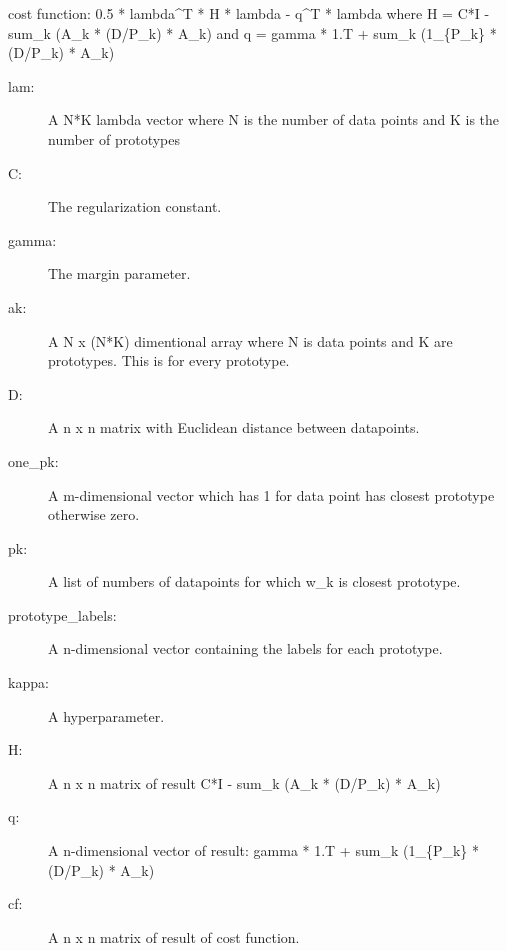 \documentclass[letterpaper,10pt,english]{sphinxmanual}
\begin{document}
\begin{fulllineitems}
\begin{fulllineitems}
cost function: 0.5 * lambda\textasciicircum{}T * H * lambda - q\textasciicircum{}T * lambda
where H = C*I - sum\_k (A\_k * (D/P\_k) * A\_k)
and q = gamma * 1.T + sum\_k (1\_\{P\_k\} * (D/P\_k) * A\_k)
\begin{description}
\item[{lam:}] \leavevmode
A N*K lambda vector where N is the number of data points and K is
the number of prototypes

\item[{C:}] \leavevmode
The regularization constant.

\item[{gamma:}] \leavevmode
The margin parameter.

\item[{ak:}] \leavevmode
A N x (N*K) dimentional array where N is data points and K are
prototypes. This is for every prototype.

\item[{D:}] \leavevmode
A n x n matrix with Euclidean distance between datapoints.

\item[{one\_pk:}] \leavevmode
A m-dimensional vector which has 1 for data point has
closest prototype otherwise zero.

\item[{pk:}] \leavevmode
A list  of numbers of datapoints for which w\_k is closest
prototype.

\item[{prototype\_labels:}] \leavevmode
A n-dimensional vector containing the labels for each
prototype.

\item[{kappa:}] \leavevmode
A hyperparameter.

\end{description}
\begin{description}
\item[{H:}] \leavevmode
A n x n matrix of result C*I - sum\_k (A\_k * (D/P\_k) * A\_k)

\item[{q:}] \leavevmode
A n-dimensional vector of result:
gamma * 1.T + sum\_k (1\_\{P\_k\} * (D/P\_k) * A\_k)

\item[{cf:}] \leavevmode
A n x n matrix of result of cost function.

\end{description}

\end{fulllineitems}


\end{fulllineitems}
\end{document}
